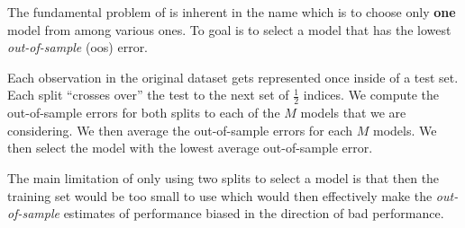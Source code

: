 \documentclass[12pt]{article}
\begin{document}
\newpage

\begin{enumerate}

\begin{tcolorbox}[colback=white, sharp corners]
The fundamental problem of  is inherent in the name which is to choose only \textbf{one} model from among various ones. To goal is to select a model that has the lowest \textit{out-of-sample} (oos) error. 
\end{tcolorbox}


\begin{tcolorbox}[colback=white, sharp corners]

Each observation in the original dataset gets represented once inside of a test set. Each split ``crosses over'' the test to the next set of $\frac{1}{2}$ indices. We compute the out-of-sample errors for both splits to each of the $M$ models that we are considering. We then average the out-of-sample errors for each $M$ models. We then select the model with the lowest average out-of-sample error. 

\end{tcolorbox}


\begin{tcolorbox}[colback=white, sharp corners]
The main limitation of only using two splits to select a model is that then the training set would be too small to use which would then effectively make the \emph{out-of-sample} estimates of performance biased in the direction of bad performance. 
\end{tcolorbox}



\end{enumerate}
\end{document}
